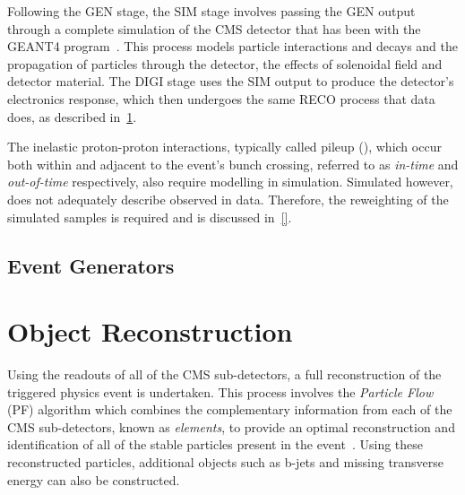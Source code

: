Following the GEN stage, the SIM stage involves passing the GEN output through a complete simulation of the CMS detector that has been with the GEANT4 program~\cite{geant4,Lefebure:1999wja}.
This process models particle interactions and decays and the propagation of particles through the detector, the effects of solenoidal field and detector material.
The DIGI stage uses the SIM output to produce the detector's electronics response, which then undergoes the same RECO process that data does, as described in~\ref{sec:reco}.

The inelastic proton-proton interactions, typically called pileup (\PU), which occur both within and adjacent to the event's bunch crossing, referred to as \emph{in-time} and \emph{out-of-time} \PU  respectively, also require modelling in simulation.
Simulated \PU however, does not adequately describe observed \PU in data.
Therefore, the reweighting of the simulated samples is required and is discussed in~\ref{}.

\subsection{Event Generators}\label{subsec:eventGenerators}

\section{Object Reconstruction}\label{sec:reco}
Using the readouts of all of the CMS sub-detectors, a full reconstruction of the triggered physics event is undertaken.
This process involves the \emph{Particle Flow} (PF) algorithm which combines the complementary information from each of the CMS sub-detectors, known as \emph{elements}, to provide an optimal reconstruction and identification of all of the stable particles present in the event~\cite{CMS:2009nxa,CMS:2010eua,CMS-PRF-14-001}.
Using these reconstructed particles, additional objects such as b-jets and missing transverse energy can also be constructed.

